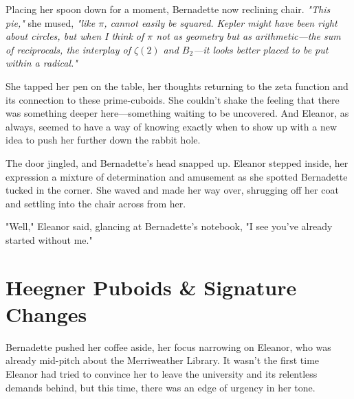 Placing her spoon down for a moment, Bernadette now reclining chair. \textit{"This pie,"} she mused, \textit{"like \(\pi\), cannot easily be squared. Kepler might have been right about circles, but when I think of \(\pi\) not as geometry but as arithmetic—the sum of reciprocals, the interplay of \(\zeta(2)\) and \(B_2\)—it looks better placed to be put within a radical."}





She tapped her pen on the table, her thoughts returning to the zeta function and its connection to these prime-cuboids. She couldn’t shake the feeling that there was something deeper here—something waiting to be uncovered. And Eleanor, as always, seemed to have a way of knowing exactly when to show up with a new idea to push her further down the rabbit hole.

The door jingled, and Bernadette’s head snapped up. Eleanor stepped inside, her expression a mixture of determination and amusement as she spotted Bernadette tucked in the corner. She waved and made her way over, shrugging off her coat and settling into the chair across from her.

"Well," Eleanor said, glancing at Bernadette’s notebook, "I see you’ve already started without me."

\newpage
\section*{Heegner Puboids \& Signature Changes}

Bernadette pushed her coffee aside, her focus narrowing on Eleanor, who was already mid-pitch about the Merriweather Library. It wasn’t the first time Eleanor had tried to convince her to leave the university and its relentless demands behind, but this time, there was an edge of urgency in her tone.

